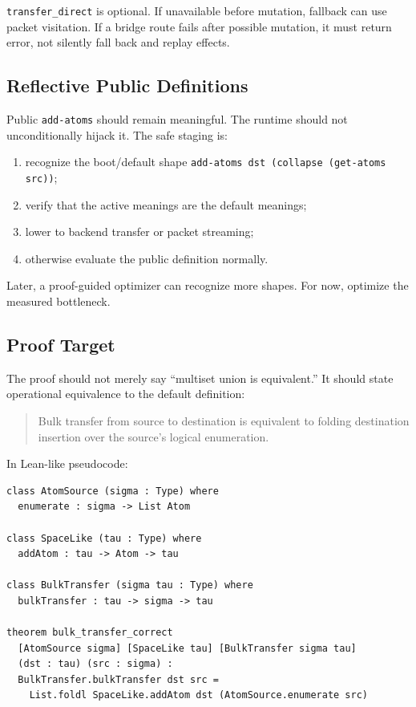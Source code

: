 \documentclass[11pt]{article}
\begin{document}
\texttt{transfer\_direct} is optional.  If unavailable before mutation, fallback can use packet visitation.  If a bridge route fails after possible mutation, it must return error, not silently fall back and replay effects.

\subsection{Reflective Public Definitions}

Public \texttt{add-atoms} should remain meaningful.  The runtime should not unconditionally hijack it.  The safe staging is:

\begin{enumerate}[leftmargin=*]
  \item recognize the boot/default shape \texttt{add-atoms dst (collapse (get-atoms src))};
  \item verify that the active meanings are the default meanings;
  \item lower to backend transfer or packet streaming;
  \item otherwise evaluate the public definition normally.
\end{enumerate}

Later, a proof-guided optimizer can recognize more shapes.  For now, optimize the measured bottleneck.

\subsection{Proof Target}

The proof should not merely say ``multiset union is equivalent.''  It should state operational equivalence to the default definition:

\begin{quote}
Bulk transfer from source to destination is equivalent to folding destination insertion over the source's logical enumeration.
\end{quote}

In Lean-like pseudocode:

\begin{lstlisting}
class AtomSource (sigma : Type) where
  enumerate : sigma -> List Atom

class SpaceLike (tau : Type) where
  addAtom : tau -> Atom -> tau

class BulkTransfer (sigma tau : Type) where
  bulkTransfer : tau -> sigma -> tau

theorem bulk_transfer_correct
  [AtomSource sigma] [SpaceLike tau] [BulkTransfer sigma tau]
  (dst : tau) (src : sigma) :
  BulkTransfer.bulkTransfer dst src =
    List.foldl SpaceLike.addAtom dst (AtomSource.enumerate src)
\end{lstlisting}
\end{document}
